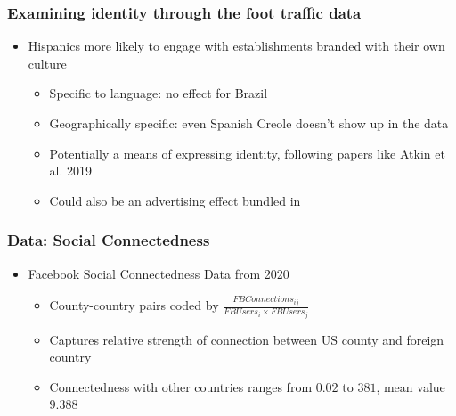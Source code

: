 \documentclass{beamer}
\begin{document}
\begin{frame}
\frametitle{Examining identity through the foot traffic data}
\begin{itemize}
\item Hispanics more likely to engage with establishments branded with their own culture
\begin{itemize}
\item Specific to language: no effect for Brazil
\item Geographically specific: even Spanish Creole doesn't show up in the data
\item Potentially a means of expressing identity, following papers like Atkin et al. 2019
\item Could also be an advertising effect bundled in
\end{itemize}
\end{itemize}
\end{frame}

\begin{frame}
\frametitle{Data: Social Connectedness}
\begin{itemize}
\item Facebook Social Connectedness Data from 2020
\begin{itemize}
\item County-country pairs coded by $\frac{FB Connections_{ij}}{FB Users_{i} \times FB Users_{j}}$
\item Captures relative strength of connection between US county and foreign country
\item Connectedness with other countries ranges from $0.02$ to $381$, mean value $9.388$
\end{itemize}
\end{itemize}
\end{frame}
\end{document}
